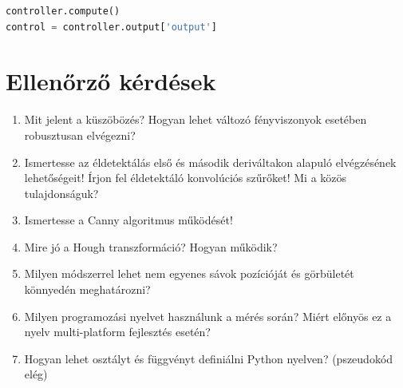 \documentclass[12pt,a4paper,oneside]{report}             %
\begin{document}
\begin{lstlisting}[language=Python]
controller.compute()
control = controller.output['output']
\end{lstlisting}

\chapter{Ellenőrző kérdések}

\begin{enumerate}
\item Mit jelent a küszöbözés? Hogyan lehet változó fényviszonyok esetében robusztusan elvégezni?
\item Ismertesse az éldetektálás első és második deriváltakon alapuló elvégzésének lehetőségeit! Írjon fel éldetektáló konvolúciós szűrőket! Mi a közös tulajdonságuk?
\item Ismertesse a Canny algoritmus működését!
\item Mire jó a Hough transzformáció? Hogyan működik?
\item Milyen módszerrel lehet nem egyenes sávok pozícióját és görbületét könnyedén meghatározni?
\item Milyen programozási nyelvet használunk a mérés során? Miért előnyös ez a nyelv multi-platform fejlesztés esetén?
\item Hogyan lehet osztályt és függvényt definiálni Python nyelven? (pszeudokód elég)
\end{enumerate}

\printbibliography
\end{document}
